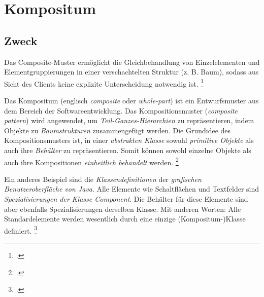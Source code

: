 \documentclass{lehramt-informatik-haupt}
\begin{document}

\chapter{Kompositum}

\begin{quellen}
\item \cite{wiki:kompositum}
\item \cite[Seite 139-147]{gof}
\item \cite[Seite 102-104]{eilebrecht}
\item \cite[Kapitel 14, Seite 173]{siebler}
\end{quellen}

\section{Zweck}

Das Composite-Muster ermöglicht die Gleichbehandlung von Einzelelementen
und Elementgruppierungen in einer verschachtelten Struktur (z. B. Baum),
sodass aus Sicht des Clients keine explizite Unterscheidung notwendig
ist.
\footcite[Seite 102]{eilebrecht}

%

Das Kompositum (englisch \emph{composite} oder \emph{whole-part}) ist
ein Entwurfsmuster aus dem Bereich der Softwareentwicklung. Das
Kompositionsmuster (\emph{composite pattern}) wird angewendet, um
\emph{Teil-Ganzes-Hierarchien} zu repräsentieren, indem Objekte zu
\emph{Baumstrukturen} zusammengefügt werden. Die Grundidee des
Kompositionsmusters ist, in einer \emph{abstrakten Klasse} sowohl
\emph{primitive Objekte} als auch ihre \emph{Behälter} zu
repräsentieren. Somit können sowohl einzelne Objekte als auch ihre
Kompositionen \emph{einheitlich behandelt} werden.
\footcite{aud:fs:4}

Ein anderes Beispiel sind die \emph{Klassendefinitionen} der
\emph{grafischen Benutzeroberfläche von Java}. Alle Elemente wie
Schaltflächen und Textfelder sind \emph{Spezialisierungen der Klasse
Component}. Die Behälter für diese Elemente sind aber ebenfalls
Spezialisierungen derselben Klasse. Mit anderen Worten: Alle
Standardelemente werden wesentlich durch eine einzige
(Kompositum-)Klasse definiert.
\footcite{wiki:kompositum}
\end{document}
